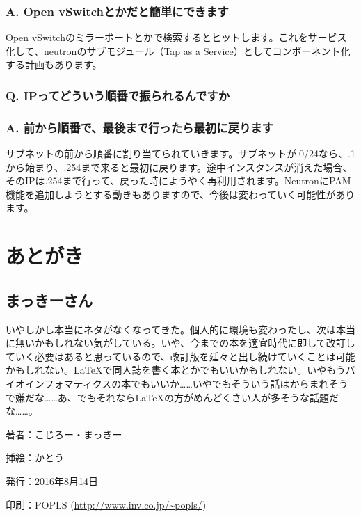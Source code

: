 \documentclass[9pt,b5paper,tombo,openany]{jsbook}
\begin{document}
\subsection*{{\LARGE\bfseries A.} Open vSwitchとかだと簡単にできます}
Open vSwitchのミラーポートとかで検索するとヒットします。これをサービス化して、neutronのサブモジュール（Tap as a Service）としてコンポーネント化する計画もあります。

\subsection*{{\LARGE\bfseries Q.} IPってどういう順番で振られるんですか}
\subsection*{{\LARGE\bfseries A.} 前から順番で、最後まで行ったら最初に戻ります}
サブネットの前から順番に割り当てられていきます。サブネットが.0/24なら、.1から始まり、.254まで来ると最初に戻ります。途中インスタンスが消えた場合、そのIPは.254まで行って、戻った時にようやく再利用されます。NeutronにPAM機能を追加しようとする動きもありますので、今後は変わっていく可能性があります。

\chapter{あとがき}

\section*{まっきーさん}

いやしかし本当にネタがなくなってきた。個人的に環境も変わったし、次は本当に無いかもしれない気がしている。いや、今までの本を適宜時代に即して改訂していく必要はあると思っているので、改訂版を延々と出し続けていくことは可能かもしれない。\LaTeX で同人誌を書く本とかでもいいかもしれない。いやもうバイオインフォマティクスの本でもいいか……いやでもそういう話はからまれそうで嫌だな……あ、でもそれなら\LaTeX の方がめんどくさい人が多そうな話題だな……。



\newpage

\thispagestyle{empty}
\begin{flushright}
	\begin{minipage}{0.5\paperwidth}
		\begin{description}
			\item{著者：}こじろー・まっきー
			\item{挿絵：}かとう
			\item{発行：}2016年8月14日
			\item{印刷：}POPLS (\url{http://www.inv.co.jp/~popls/})
		\end{description}
	\end{minipage}
\end{flushright}
\end{document}
